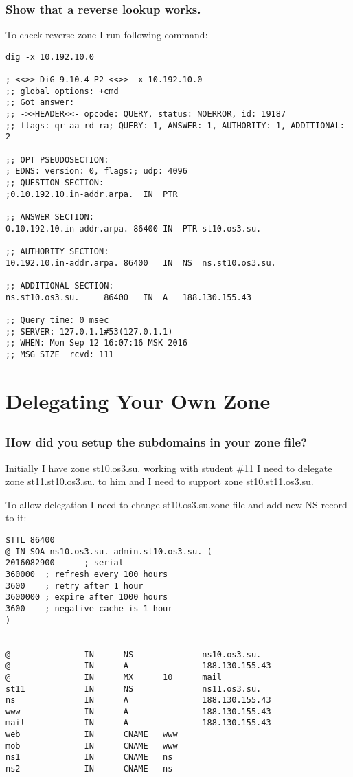 \documentclass[a4paper,11pt]{article}
\begin{document}
\subsubsection{Show that a reverse lookup works.}

To check reverse zone I run following command:

\begin{lstlisting}
dig -x 10.192.10.0      

; <<>> DiG 9.10.4-P2 <<>> -x 10.192.10.0
;; global options: +cmd
;; Got answer:
;; ->>HEADER<<- opcode: QUERY, status: NOERROR, id: 19187
;; flags: qr aa rd ra; QUERY: 1, ANSWER: 1, AUTHORITY: 1, ADDITIONAL: 2

;; OPT PSEUDOSECTION:
; EDNS: version: 0, flags:; udp: 4096
;; QUESTION SECTION:
;0.10.192.10.in-addr.arpa.  IN  PTR

;; ANSWER SECTION:
0.10.192.10.in-addr.arpa. 86400 IN  PTR st10.os3.su.

;; AUTHORITY SECTION:
10.192.10.in-addr.arpa. 86400   IN  NS  ns.st10.os3.su.

;; ADDITIONAL SECTION:
ns.st10.os3.su.     86400   IN  A   188.130.155.43

;; Query time: 0 msec
;; SERVER: 127.0.1.1#53(127.0.1.1)
;; WHEN: Mon Sep 12 16:07:16 MSK 2016
;; MSG SIZE  rcvd: 111

\end{lstlisting}

\section{Delegating Your Own Zone}
\addtocounter{subsection}{3}
\subsection{}
\subsubsection{How did you setup the subdomains in your zone file?}
Initially I have zone st10.os3.su. working with student \#11 I need to delegate zone st11.st10.os3.su. to him and I need to support zone st10.st11.os3.su.

To allow delegation I need to change st10.os3.su.zone file and add new NS record to it:

\begin{lstlisting}
$TTL 86400
@ IN SOA ns10.os3.su. admin.st10.os3.su. (
2016082900      ; serial
360000  ; refresh every 100 hours
3600    ; retry after 1 hour
3600000 ; expire after 1000 hours
3600    ; negative cache is 1 hour
)


@               IN      NS              ns10.os3.su.
@               IN      A               188.130.155.43
@               IN      MX      10      mail
st11            IN      NS              ns11.os3.su.
ns              IN      A               188.130.155.43
www             IN      A               188.130.155.43
mail            IN      A               188.130.155.43
web             IN      CNAME   www
mob             IN      CNAME   www
ns1             IN      CNAME   ns
ns2             IN      CNAME   ns
\end{lstlisting}
\end{document}
